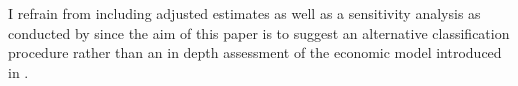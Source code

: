 I refrain from including adjusted estimates as well as a sensitivity analysis as conducted by \textcite{Ellingsen.2003} since the aim of this paper is to suggest an alternative classification procedure rather than an in depth assessment of the economic model introduced in \textcite{Ellingsen.2001}.
%